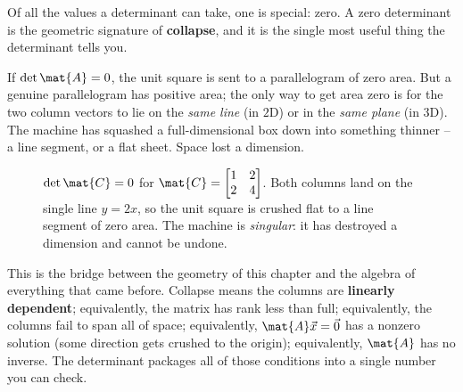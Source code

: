 Of all the values a determinant can take, one is special: zero. A zero determinant
is the geometric signature of \textbf{collapse}, and it is the single most useful
thing the determinant tells you.

If $\det\mat{A} = 0$, the unit square is sent to a parallelogram of zero area. But
a genuine parallelogram has positive area; the only way to get area zero is for the
two column vectors to lie on the \emph{same line} (in $2$D) or in the \emph{same
plane} (in $3$D). The machine has squashed a full-dimensional box down into
something thinner -- a line segment, or a flat sheet. Space lost a dimension.

\begin{figure}[H]
\centering
{}
\caption{$\det\mat{C}=0$ for $\mat{C}=\protect\begin{bmatrix}1&2\\2&4\protect\end{bmatrix}$.
Both columns land on the single line $y=2x$, so the unit square is crushed flat to
a line segment of zero area. The machine is \emph{singular}: it has destroyed a
dimension and cannot be undone.}
\label{ch21:fig-collapse}
\end{figure}

This is the bridge between the geometry of this chapter and the algebra of
everything that came before. Collapse means the columns are \textbf{linearly
dependent}; equivalently, the matrix has rank less than full; equivalently, the
columns fail to span all of space; equivalently, $\mat{A}\vec x = \vec 0$ has a
nonzero solution (some direction gets crushed to the origin); equivalently,
$\mat{A}$ has no inverse. The determinant packages all of those conditions into a
single number you can check.

